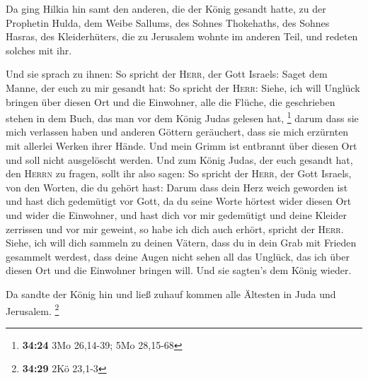  Da ging Hilkia hin samt den anderen, die der König
gesandt hatte, zu der Prophetin Hulda, dem Weibe Sallums, des Sohnes
Thokehaths, des Sohnes Hasras, des Kleiderhüters, die zu Jerusalem
wohnte im anderen Teil, und redeten solches mit ihr.

 Und sie sprach zu ihnen: So spricht der \textsc{Herr},
der Gott Israels: Saget dem Manne, der euch zu mir gesandt hat:
 So spricht der \textsc{Herr}: Siehe, ich will Unglück
bringen über diesen Ort und die Einwohner, alle die Flüche, die
geschrieben stehen in dem Buch, das man vor dem König Judas gelesen hat,
\footnote{\textbf{34:24} 3Mo 26,14-39; 5Mo 28,15-68} 
darum dass sie mich verlassen haben und anderen Göttern geräuchert, dass
sie mich erzürnten mit allerlei Werken ihrer Hände. Und mein Grimm ist
entbrannt über diesen Ort und soll nicht ausgelöscht werden.
 Und zum König Judas, der euch gesandt hat, den
\textsc{Herrn} zu fragen, sollt ihr also sagen: So spricht der
\textsc{Herr}, der Gott Israels, von den Worten, die du gehört hast:
 Darum dass dein Herz weich geworden ist und hast dich
gedemütigt vor Gott, da du seine Worte hörtest wider diesen Ort und
wider die Einwohner, und hast dich vor mir gedemütigt und deine Kleider
zerrissen und vor mir geweint, so habe ich dich auch erhört, spricht der
\textsc{Herr}.  Siehe, ich will dich sammeln zu deinen
Vätern, dass du in dein Grab mit Frieden gesammelt werdest, dass deine
Augen nicht sehen all das Unglück, das ich über diesen Ort und die
Einwohner bringen will. Und sie sagten's dem König wieder.

 Da sandte der König hin und ließ zuhauf kommen alle
Ältesten in Juda und Jerusalem. \footnote{\textbf{34:29} 2Kö 23,1-3}

